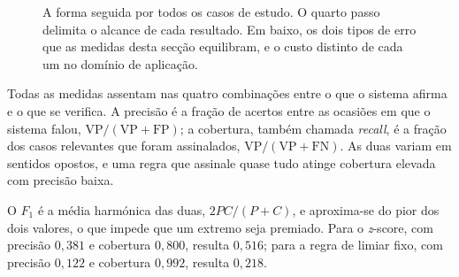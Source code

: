 \begin{figure}[ht]
\centering
{}
\caption[A forma comum aos quatro casos de estudo]{A forma seguida por todos os casos de estudo. O
quarto passo delimita o alcance de cada resultado. Em baixo, os dois tipos de erro que as medidas
desta secção equilibram, e o custo distinto de cada um no domínio de aplicação.}
\label{fig:av_forma}
\end{figure}

Todas as medidas assentam nas quatro combinações entre o que o sistema afirma e o que se verifica.
A precisão é a fração de acertos entre as ocasiões em que o sistema falou,
$\mathrm{VP}/(\mathrm{VP}+\mathrm{FP})$; a cobertura, também chamada \emph{recall}, é a fração dos
casos relevantes que foram assinalados, $\mathrm{VP}/(\mathrm{VP}+\mathrm{FN})$. As duas variam em
sentidos opostos, e uma regra que assinale quase tudo atinge cobertura elevada com precisão baixa.

O $F_1$ é a média harmónica das duas, $2PC/(P+C)$, e aproxima-se do pior dos dois valores, o que
impede que um extremo seja premiado. Para o \emph{z}-score, com precisão $0{,}381$ e cobertura
$0{,}800$, resulta $0{,}516$; para a regra de limiar fixo, com precisão $0{,}122$ e cobertura
$0{,}992$, resulta $0{,}218$.


